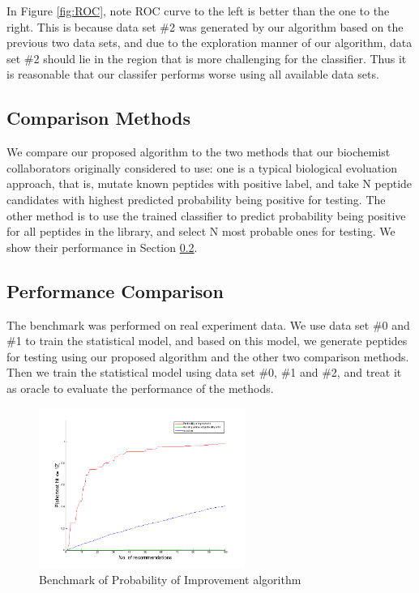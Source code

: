 \documentclass[opre,nonblindrev]{informs3} %
\begin{document}
In Figure \ref{fig:ROC}, note ROC curve to the left is better than the one to the right. This is because data set \#2 was generated by our algorithm based on the previous two data sets, and due to the exploration manner of our algorithm, data set \#2 should lie in the region that is more challenging for the classifier. Thus it is reasonable that our classifer performs worse using all available data sets. 

\subsection{Comparison Methods} \label{sec:comparison methods}
We compare our proposed algorithm to the two methods that our biochemist collaborators originally considered to use: one is a typical biological evoluation approach, that is, mutate known peptides with positive label, and take N peptide candidates with highest predicted probability being positive for testing. The other method is to use the trained classifier to predict probability being positive for all peptides in the library, and select N most probable ones for testing. We show their
performance in Section \ref{sec:performance}.

\subsection{Performance Comparison} \label{sec:performance}
The benchmark was performed on real experiment data. We use data set \#0 and \#1 to train the statistical model, and based on this model, we generate peptides for testing using our proposed algorithm and the other two comparison methods. Then we train the statistical model using data set \#0, \#1 and \#2, and treat it as oracle to evaluate the performance of the methods.

\begin{figure}[hpt] 
\center
\includegraphics[width=0.6\textwidth]{pic/PI.png}
\caption{Benchmark of Probability of Improvement algorithm}
\label{fig:PI}
\end{figure}
\end{document}
